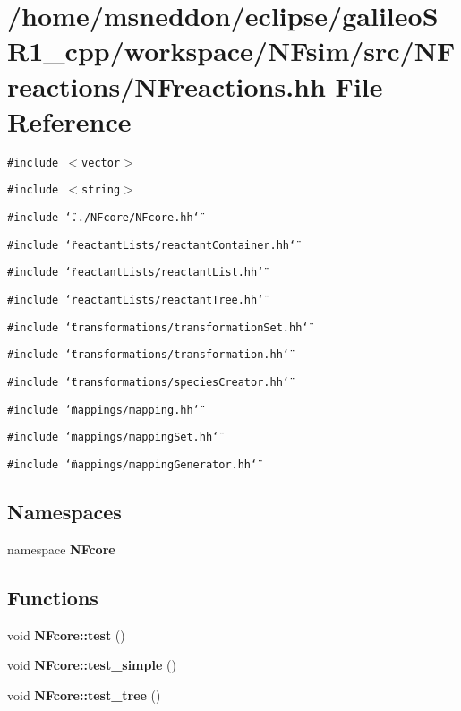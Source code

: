 \section{/home/msneddon/eclipse/galileoSR1\_\-cpp/workspace/NFsim/src/NFreactions/NFreactions.hh File Reference}
\label{NFreactions_8hh}


{\tt \#include $<$vector$>$}\par
{\tt \#include $<$string$>$}\par
{\tt \#include \char`\"{}../NFcore/NFcore.hh\char`\"{}}\par
{\tt \#include \char`\"{}reactantLists/reactantContainer.hh\char`\"{}}\par
{\tt \#include \char`\"{}reactantLists/reactantList.hh\char`\"{}}\par
{\tt \#include \char`\"{}reactantLists/reactantTree.hh\char`\"{}}\par
{\tt \#include \char`\"{}transformations/transformationSet.hh\char`\"{}}\par
{\tt \#include \char`\"{}transformations/transformation.hh\char`\"{}}\par
{\tt \#include \char`\"{}transformations/speciesCreator.hh\char`\"{}}\par
{\tt \#include \char`\"{}mappings/mapping.hh\char`\"{}}\par
{\tt \#include \char`\"{}mappings/mappingSet.hh\char`\"{}}\par
{\tt \#include \char`\"{}mappings/mappingGenerator.hh\char`\"{}}\par
\subsection*{Namespaces}
\begin{CompactItemize}
\item 
namespace {\bf NFcore}
\end{CompactItemize}
\subsection*{Functions}
\begin{CompactItemize}
\item 
void {\bf NFcore::test} ()
\item 
void {\bf NFcore::test\_\-simple} ()
\item 
void {\bf NFcore::test\_\-tree} ()
\end{CompactItemize}
